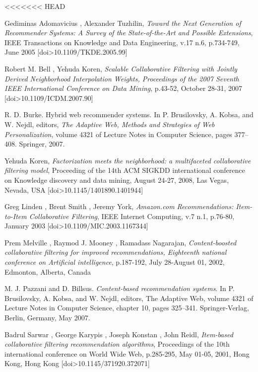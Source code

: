 \documentclass[11pt,letterpaper]{article}
\begin{document}
\newpage
\newpage
<<<<<<< HEAD
\begin{thebibliography}{13}
   Gediminas Adomavicius , Alexander Tuzhilin, \textit{Toward the Next Generation of Recommender Systems: A Survey of the State-of-the-Art and Possible Extensions}, IEEE Transactions on Knowledge and Data Engineering, v.17 n.6, p.734-749, June 2005  [doi>10.1109/TKDE.2005.99]

   Robert M. Bell , Yehuda Koren, \textit{Scalable Collaborative Filtering with Jointly Derived Neighborhood Interpolation Weights, Proceedings of the 2007 Seventh IEEE International Conference on Data Mining}, p.43-52, October 28-31, 2007  [doi>10.1109/ICDM.2007.90]

   R. D. Burke. Hybrid web recommender systems. In P. Brusilovsky, A. Kobsa, and W. Nejdl, editors, \textit{The Adaptive Web, Methods and Strategies of Web Personalization}, volume 4321 of Lecture Notes in Computer Science, pages 377--408. Springer, 2007.

   Yehuda Koren, \textit{Factorization meets the neighborhood: a multifaceted collaborative filtering model}, Proceeding of the 14th ACM SIGKDD international conference on Knowledge discovery and data mining, August 24-27, 2008, Las Vegas, Nevada, USA  [doi>10.1145/1401890.1401944]

   Greg Linden , Brent Smith , Jeremy York, \textit{Amazon.com Recommendations: Item-to-Item Collaborative Filtering}, IEEE Internet Computing, v.7 n.1, p.76-80, January 2003  [doi>10.1109/MIC.2003.1167344]

   Prem Melville , Raymod J. Mooney , Ramadass Nagarajan, \textit{Content-boosted collaborative filtering for improved recommendations, Eighteenth national conference on Artificial intelligence}, p.187-192, July 28-August 01, 2002, Edmonton, Alberta, Canada

   M. J. Pazzani and D. Billsus. \textit{Content-based recommendation systems}. In P. Brusilovsky, A. Kobsa, and W. Nejdl, editors, The Adaptive Web, volume 4321 of Lecture Notes in Computer Science, chapter 10, pages 325--341. Springer-Verlag, Berlin, Germany, May 2007.

   Badrul Sarwar , George Karypis , Joseph Konstan , John Reidl, \textit{Item-based collaborative filtering recommendation algorithms}, Proceedings of the 10th international conference on World Wide Web, p.285-295, May 01-05, 2001, Hong Kong, Hong Kong  [doi>10.1145/371920.372071]


\end{thebibliography}
\end{document}
